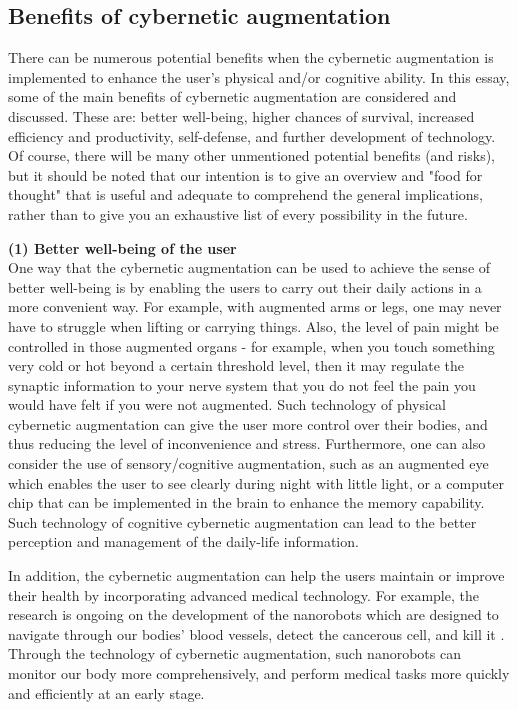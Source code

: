 \subsection{Benefits of cybernetic augmentation}

There can be numerous potential benefits when the cybernetic augmentation is implemented to enhance the user's physical and/or cognitive ability. In this essay, some of the main benefits of cybernetic augmentation are considered and discussed. These are: better well-being, higher chances of survival, increased efficiency and productivity, self-defense, and further development of technology. Of course, there will be many other unmentioned potential benefits (and risks), but it should be noted that our intention is to give an overview and "food for thought" that is useful and adequate to comprehend the general implications, rather than to give you an exhaustive list of every possibility in the future. 

{\bf (1) Better well-being of the user} \\
One way that the cybernetic augmentation can be used to achieve the sense of better well-being is by enabling the users to carry out their daily actions in a more convenient way. For example, with augmented arms or legs, one may never have to struggle when lifting or carrying things. Also, the level of pain might be controlled in those augmented organs - for example, when you touch something very cold or hot beyond a certain threshold level, then it may regulate the synaptic information to your nerve system that you do not feel the pain you would have felt if you were not augmented. Such technology of physical cybernetic augmentation can give the user more control over their bodies, and thus reducing the level of inconvenience and stress. Furthermore, one can also consider the use of sensory/cognitive augmentation, such as an augmented eye which enables the user to see clearly during night with little light, or a computer chip that can be implemented in the brain to enhance the memory capability. Such technology of cognitive cybernetic augmentation can lead to the better perception and management of the daily-life information.

In addition, the cybernetic augmentation can help the users maintain or improve their health by incorporating advanced medical technology. For example, the research is ongoing on the development of the nanorobots which are designed to navigate through our bodies' blood vessels, detect the cancerous cell, and kill it \cite{nanorobot}. Through the technology of cybernetic augmentation, such nanorobots can monitor our body more comprehensively, and perform medical tasks more quickly and efficiently at an early stage. 


